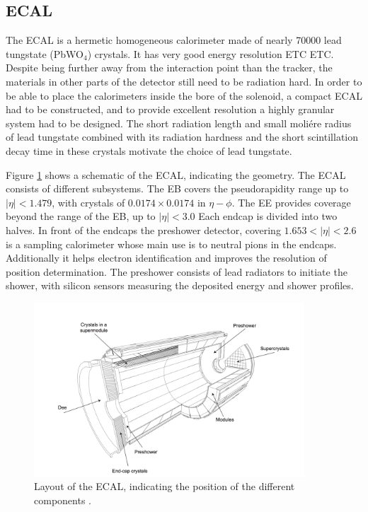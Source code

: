 \subsection{ECAL}
\label{sec:CMSLHC_CMS_ecal}
The \ac{ECAL} \cite{cms-jinst} is a hermetic homogeneous calorimeter
made of nearly 70000 lead tungstate (PbWO$_4$) crystals. It has very
good energy resolution ETC ETC. %
Despite being further away from the interaction
point than the tracker, the materials in other parts of the detector
still need to be radiation hard. In order to be able to place
the calorimeters inside the bore of the solenoid, a compact \ac{ECAL}
had to be constructed, and to provide excellent resolution a 
highly granular system had to be designed. The short radiation
length and small moli\'ere radius of lead tungstate %
combined with its radiation hardness and the short scintillation decay
time in these crystals motivate the choice of lead tungstate.

Figure \ref{fig:CMS_ECAL} shows a schematic of the \ac{ECAL}, indicating
the geometry. The \ac{ECAL} consists of different subsystems. The \ac{EB} 
covers the pseudorapidity range up to $|\eta|<1.479$, with
crystals of $0.0174 \times 0.0174$ in $\eta - \phi$. The \ac{EE}
provides coverage beyond the range of the \ac{EB}, up to $|\eta|<3.0$
Each endcap is divided into two halves. In front of the endcaps 
the preshower detector, covering $1.653<|\eta|<2.6$ is a sampling
calorimeter whose main use is to neutral pions in the endcaps. Additionally
it helps electron identification and improves the resolution
of position determination. The preshower consists
of lead radiators to initiate the shower, with silicon sensors
measuring the deposited energy and shower profiles. %

\begin{figure}[h!]
\begin{center}
\includegraphics[width=0.9\textwidth]{./Detector/Plots/ECAL.png}
\caption{Layout of the \ac{ECAL}, indicating the position of the
different components \cite{cms-jinst}.}
\label{fig:CMS_ECAL}
\end{center}
\end{figure}

